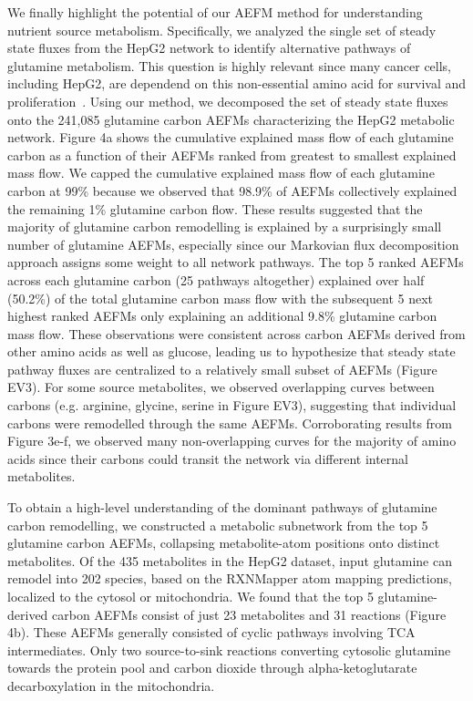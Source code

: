 \documentclass[12pt]{article}
\begin{document}
We finally highlight the potential of our AEFM method for understanding
nutrient source metabolism. Specifically, we analyzed the single set of
steady state fluxes from the HepG2 network to identify alternative
pathways of glutamine metabolism. This question is highly relevant since
many cancer cells, including HepG2, are dependend on this non-essential
amino acid for survival and
proliferation~\citep{YeYanyan2023Gmri,YooHeeChan2020Gric}. Using our
method, we decomposed the set of steady state fluxes onto the 241,085
glutamine carbon AEFMs characterizing the HepG2 metabolic network. Figure
4a shows the cumulative explained mass flow of each glutamine carbon as
a function of their AEFMs ranked from greatest to smallest explained mass
flow. We capped the cumulative explained mass flow of each glutamine
carbon at 99\% because we observed that 98.9\% of AEFMs collectively
explained the remaining 1\% glutamine carbon flow. These results suggested
that the majority of glutamine carbon remodelling is explained by
a surprisingly small number of glutamine AEFMs, especially since our
Markovian flux decomposition approach assigns some weight to all network
pathways. The top 5 ranked AEFMs across each glutamine carbon (25 pathways
altogether) explained over half (50.2\%) of the total glutamine carbon
mass flow with the subsequent 5 next highest ranked AEFMs only explaining
an additional 9.8\% glutamine carbon mass flow. These observations were
consistent across carbon AEFMs derived from other amino acids as well as
glucose, leading us to hypothesize that steady state pathway fluxes are
centralized to a relatively small subset of AEFMs (Figure EV3). For some
source metabolites, we observed overlapping curves between carbons (e.g.
arginine, glycine, serine in Figure EV3), suggesting that individual
carbons were remodelled through the same AEFMs. Corroborating results from
Figure 3e-f, we observed many non-overlapping curves for the majority of
amino acids since their carbons could transit the network via different
internal metabolites.


To obtain a high-level understanding of the dominant pathways of glutamine
carbon remodelling, we constructed a metabolic subnetwork from the top
5 glutamine carbon AEFMs, collapsing metabolite-atom positions onto distinct
metabolites. Of the 435 metabolites in the HepG2 dataset, input glutamine
can remodel into 202 species, based on the RXNMapper atom mapping
predictions, localized to the cytosol or mitochondria. We found that the
top 5 glutamine-derived carbon AEFMs consist of just 23 metabolites and
31 reactions (Figure 4b). These AEFMs generally consisted of cyclic
pathways involving TCA intermediates. Only two source-to-sink reactions
converting cytosolic glutamine towards the protein pool and carbon dioxide
through alpha-ketoglutarate decarboxylation in the mitochondria. 
\end{document}
